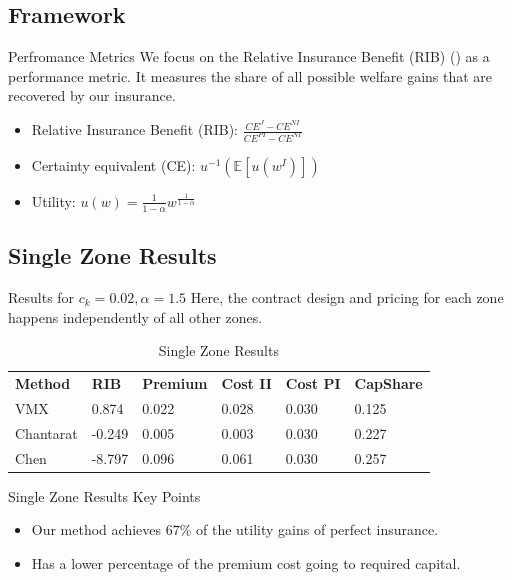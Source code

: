 \documentclass{beamer}
\begin{document}
\subsection{Framework}
\begin{frame}{Perfromance Metrics}
    We focus on the Relative Insurance Benefit (RIB) (\cite{kenduiywo2021evaluating}) as a performance metric. It measures the share of all possible welfare gains that are recovered by our insurance. \\
    \begin{itemize}
        \setlength\itemsep{1em}
        \item Relative Insurance Benefit (RIB): $\frac{CE^J - CE^{NI}}{CE^{PI}-CE^{NI}}$
        \item Certainty equivalent (CE): $u^{-1}(\mathbb{E}[u(w^I)])$
        \item Utility: $u(w) = \frac{1}{1-\alpha} w^{\frac{1}{1-\alpha}}$
    \end{itemize}
\end{frame}

\subsection{Single Zone Results}
\begin{frame}{Results for $c_k=0.02, \alpha=1.5$ }
    Here, the contract design and pricing for each zone happens independently of all other zones. 
    \begin{table}[]
        \centering
        \small
        \caption{Single Zone Results}
        \begin{tabular}{llllll}
        \textbf{Method} & \textbf{RIB}  & \textbf{Premium} & \textbf{Cost II} & \textbf{Cost PI} & \textbf{CapShare} \\
        VMX       & 0.874   & 0.022 & 0.028 & 0.030 & 0.125 \\
        Chantarat & -0.249  & 0.005 & 0.003 & 0.030 & 0.227 \\
        Chen      & -8.797  & 0.096 & 0.061 & 0.030 & 0.257
        \end{tabular}
        \end{table}
    
\end{frame}

\begin{frame}{Single Zone Results Key Points}
    \begin{itemize}
        \setlength\itemsep{2em}
        \item Our method achieves $67\%$ of the utility gains of perfect insurance. 
        \item Has a lower percentage of the premium cost going to required capital. 
    \end{itemize}
\end{frame}
\end{document}
